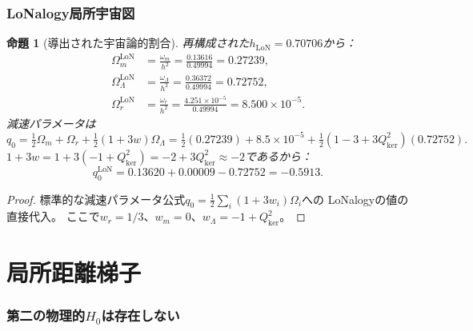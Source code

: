 \documentclass[12pt]{article}
\theoremstyle{plain}
\newtheorem{proposition}[theorem]{命題}
\theoremstyle{definition}
\numberwithin{equation}{section}
\newcommand{\kker}{\mathrm{ker}}
\newcommand{\LoN}{\mathrm{LoN}}
\begin{document}
\section{LoNalogy局所宇宙図}\label{sec:local}

\begin{proposition}[導出された宇宙論的割合]\label{prop:fractions}
再構成された$h_{\LoN}=0.70706$から：
\begin{align}
\Omega_m^{\LoN} &= \frac{\omega_m}{h^2} = \frac{0.13616}{0.49994} = 0.27239,\\
\Omega_\Lambda^{\LoN} &= \frac{\omega_\Lambda}{h^2} = \frac{0.36372}{0.49994} = 0.72752,\\
\Omega_r^{\LoN} &= \frac{\omega_r}{h^2} = \frac{4.251\times10^{-5}}{0.49994} = 8.500\times10^{-5}.
\end{align}
減速パラメータは
\begin{equation}
q_0 = \tfrac{1}{2}\Omega_m + \Omega_r + \tfrac{1}{2}(1+3w)\Omega_\Lambda
= \tfrac{1}{2}(0.27239) + 8.5\times10^{-5} + \tfrac{1}{2}(1-3+3Q_{\kker}^2)(0.72752).
\end{equation}
$1+3w=1+3(-1+Q_{\kker}^2)=-2+3Q_{\kker}^2\approx-2$であるから：
\begin{equation}
\boxed{q_0^{\LoN} = 0.13620+0.00009-0.72752 = -0.5913.}
\end{equation}
\end{proposition}

\begin{proof}
標準的な減速パラメータ公式$q_0=\frac{1}{2}\sum_i(1+3w_i)\Omega_i$への
LoNalogyの値の直接代入。
ここで$w_r=1/3$、$w_m=0$、$w_\Lambda=-1+Q_{\kker}^2$。
\end{proof}


\part{局所距離梯子}

\section{第二の物理的$H_0$は存在しない}\label{sec:nosecondH0}
\end{document}
